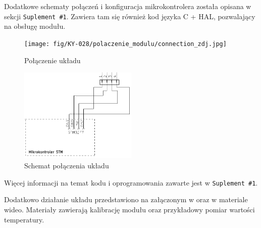 \documentclass[11pt, a4paper]{article}
\begin{document}
Dodatkowe schematy połączeń i konfiguracja
mikrokontrolera została opisana w sekcji \texttt{Suplement \#1}. Zawiera tam się również kod języka
C + HAL, pozwalający na obsługę modułu.

\newpage
\begin{figure}[h]
    \centering
    \texttt{[image: fig/KY-028/polaczenie\_modulu/connection\_zdj.jpg]}
    \caption{Połączenie układu}
    \label{fig:polaczenie_ukladu}
\end{figure}
\begin{figure}[h]
    \centering
    \includegraphics[width=0.5\textwidth]{fig/KY-028/polaczenie_modulu/stm_f7_ky_028_connection.PNG}
    \caption{Schemat połączenia układu}
    \label{fig:schemat_polaczenie_ukladu}
\end{figure}


Więcej informacji na temat kodu i oprogramowania zawarte jest w \texttt{Suplement \#1}.

\vspace{0.5cm}
Dodatkowo działanie układu przedstawiono na załączonym w \texttt{\cite{yt1}} oraz w \texttt{\cite{yt2}} materiale wideo. Materiały zawierają kalibrację modułu oraz przykładowy pomiar wartości temperatury. 

\newpage
\printbibliography[heading=bibintoc]
\end{document}
